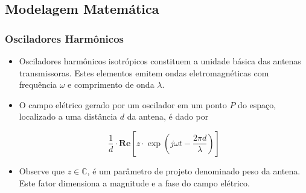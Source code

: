 \subsection{Modelagem Matemática}
\begin{frame}
\frametitle{Osciladores Harmônicos}
\begin{itemize}


\item Osciladores harmônicos isotrópicos constituem a unidade básica das antenas transmissoras. Estes elementos emitem ondas eletromagnéticas com frequ\^encia $\omega$ e comprimento de onda $\lambda$.

\item O campo elétrico gerado por um oscilador em um ponto $P$ do espa\c{c}o, localizado a uma distância $d$ da antena, é dado por

\begin{equation}
\frac{1}{d}\cdot\mathbf{Re}\left[z \cdot \exp \left( j\omega t - \frac{2\pi d}{\lambda} \right) \right]
\end{equation}

\item Observe que $z \in \mathbb{C}$,  é um parâmetro de projeto denominado peso da antena. Este fator dimensiona a magnitude e a fase do campo elétrico.

\end{itemize}
\end{frame}


